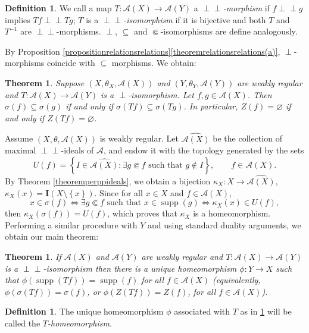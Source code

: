 \documentclass[letter,11pt]{amsart}
\theoremstyle{plain}		\newtheorem{theorem}[generalnumbering]{Theorem}
\theoremstyle{plain}		\newtheorem{corollary}[generalnumbering]{Corollary}
\theoremstyle{definition}		\newtheorem{definition}[generalnumbering]{Definition}
\theoremstyle{definition}		\newtheorem{example}[generalnumbering]{Example}
\theoremstyle{plain}		\newtheorem{proposition}[generalnumbering]{Proposition}
\theoremstyle{plain}		\newtheorem{lemma}[generalnumbering]{Lemma}
\theoremstyle{plain}    \newtheorem{plainstyle}[generalnumbering]{\namefordifferentenvironment}
\theoremstyle{plain}    \newtheorem*{plainstyle*}{\namefordifferentenvironment}
\theoremstyle{definition}    \newtheorem{definitionstyle}[generalnumbering]{\namefordifferentenvironment}
\theoremstyle{definition}    \newtheorem*{definitionstyle*}{\namefordifferentenvironment}
\newcommand{\perpp}{\perp\!\!\!\perp}
\DeclareMathOperator{\supp}{supp}
\begin{document}
\begin{definition}
	We call a map $T\colon\mathcal{A}(X)\to\mathcal{A}(Y)$ a \emph{$\perpp$-morphism} if $f\perpp g$ implies $Tf\perpp Tg$; $T$ is a \emph{$\perpp$-isomorphism} if it is bijective and both $T$ and $T^{-1}$ are $\perpp$-morphisms. $\perp$, $\subseteq$ and $\Subset$-isomorphisms are define analogously.
\end{definition}

By Proposition \ref{propositionrelationsrelations}\ref{theoremrelationsrelations(a)}, $\perp$-morphisms coincide with $\subseteq$ morphisms. We obtain:

\begin{theorem}\label{theoremdisjoint}
	Suppose $(X,\theta_X,\mathcal{A}(X))$ and $(Y,\theta_Y,\mathcal{A}(Y))$ are weakly regular and $T\colon\mathcal{A}(X)\to\mathcal{A}(Y)$ is a $\perp$-isomorphism. Let $f,g\in\mathcal{A}(X)$. Then $\sigma(f)\subseteq \sigma(g)$ if and only if $\sigma(Tf)\subseteq \sigma(Tg)$. In particular, $Z(f)=\varnothing$ if and only if $Z(Tf)=\varnothing$.
\end{theorem}

Assume $(X,\theta,\mathcal{A}(X))$ is weakly regular. Let $\widehat{\mathcal{A}(X)}$ be the collection of maximal $\perpp$-ideals of $\mathcal{A}$, and endow it with the topology generated by the sets
\[U(f)=\left\{I\in\widehat{\mathcal{A}(X)}:\exists g\Subset f\text{ such that }g\not\in I\right\},\qquad f\in\mathcal{A}(X).\]
By Theorem \ref{theoremperppideals}, we obtain a bijection $\kappa_X\colon X\to\widehat{\mathcal{A}(X)}$, $\kappa_X(x)=\mathbf{I}(X\setminus\left\{x\right\})$. Since for all $x\in X$ and $f\in\mathcal{A}(X)$,
\[x\in\sigma(f)\iff\exists g\Subset f\text{ such that } x\in\supp(g)\iff\kappa_X(x)\in U(f),\]
then $\kappa_X(\sigma(f))=U(f)$, which proves that $\kappa_X$ is a homeomorphism. Performing a similar procedure  with $Y$ and using standard duality arguments, we obtain our main theorem:

\begin{theorem}\label{maintheorem}
	If $\mathcal{A}(X)$ and $\mathcal{A}(Y)$ are weakly regular and $T\colon\mathcal{A}(X)\to\mathcal{A}(Y)$ is a $\perpp$-isomorphism then there is a unique homeomorphism $\phi\colon Y\to X$ such that $\phi(\supp(Tf))=\supp(f)$ for all $f\in \mathcal{A}(X)$ (equivalently, $\phi(\sigma(Tf))=\sigma(f)$, or $\phi(Z(Tf))=Z(f)$, for all $f\in\mathcal{A}(X)$).
\end{theorem}

\begin{definition}\label{definitionthomeomorphism}
	The unique homeomorphism $\phi$ associated with $T$ as in \ref{maintheorem} will be called the \emph{$T$-homeomorphism}.
\end{definition}
\end{document}

